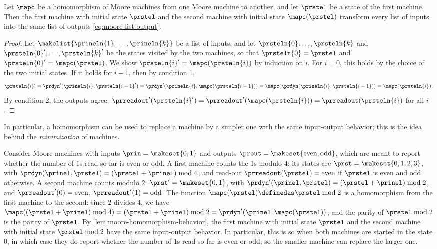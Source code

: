 \begin{lemma}
    \label{lem:moore-homomorphism-behavior}
    Let $\mapc$ be a homomorphism of Moore machines from one Moore machine to another, and let $\prstel$ be a state of the first machine.
    Then the first machine with initial state $\prstel$ and the second machine with initial state $\mapc(\prstel)$ transform every list of inputs into the same list of outputs \cref{eq:moore-list-output}.
\end{lemma}

\begin{proof}
    Let $\makelist{\prineln{1}, \dots, \prineln{k}}$ be a list of inputs, and let $\prsteln{0}, \dots, \prsteln{k}$ and $\prsteln{0}', \dots, \prsteln{k}'$ be the states visited by the two machines, so that $\prsteln{0} = \prstel$ and $\prsteln{0}' = \mapc(\prstel)$.
    We show $\prsteln{i}' = \mapc(\prsteln{i})$ by induction on $i$.
    For $i = 0$, this holds by the choice of the two initial states.
    If it holds for $i - 1$, then by condition 1,
    \begin{equation}
        \prsteln{i}' = \prdyn'(\prineln{i}, \prsteln{i-1}') = \prdyn'(\prineln{i}, \mapc(\prsteln{i-1})) = \mapc(\prdyn(\prineln{i}, \prsteln{i-1})) = \mapc(\prsteln{i}).
    \end{equation}
    By condition 2, the outputs agree: $\prreadout'(\prsteln{i}') = \prreadout'(\mapc(\prsteln{i})) = \prreadout(\prsteln{i})$ for all $i$.
\end{proof}

In particular, a homomorphism can be used to replace a machine by a simpler one with the same input-output behavior; this is the idea behind the \emph{minimization} of machines.

\begin{example}
    \label{exa:moore-parity}
    Consider Moore machines with inputs $\prin = \makeset{0, 1}$ and outputs $\prout = \makeset{\text{even}, \text{odd}}$, which are meant to report whether the number of $1$s read so far is even or odd.
    A first machine counts the $1$s modulo $4$: its states are $\prst = \makeset{0, 1, 2, 3}$, with $\prdyn(\prinel, \prstel) = (\prstel + \prinel) \bmod 4$, and read-out $\prreadout(\prstel) = \text{even}$ if $\prstel$ is even and $\text{odd}$ otherwise.
    A second machine counts modulo $2$: $\prst' = \makeset{0, 1}$, with $\prdyn'(\prinel, \prstel) = (\prstel + \prinel) \bmod 2$, and $\prreadout'(0) = \text{even}$, $\prreadout'(1) = \text{odd}$.
    The function $\mapc(\prstel) \definedas \prstel \bmod 2$ is a homomorphism from the first machine to the second: since $2$ divides $4$, we have $\mapc((\prstel + \prinel) \bmod 4) = (\prstel + \prinel) \bmod 2 = \prdyn'(\prinel, \mapc(\prstel))$; and the parity of $\prstel \bmod 2$ is the parity of $\prstel$.
    By \cref{lem:moore-homomorphism-behavior}, the first machine with initial state $\prstel$ and the second machine with initial state $\prstel \bmod 2$ have the same input-output behavior.
    In particular, this is so when both machines are started in the state $0$, in which case they do report whether the number of $1$s read so far is even or odd; so the smaller machine can replace the larger one.
\end{example}

